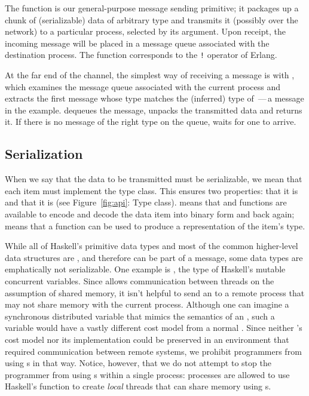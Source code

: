 \documentclass[preprint]{sigplanconf}
\begin{document}
The  function is our general-purpose message sending primitive; it packages up a chunk of (serializable) data of arbitrary type and transmits it (possibly over the network) to a particular process, selected by its  argument.
Upon receipt, the incoming message will be placed in a message queue associated with the destination process. 
The  function corresponds to the \texttt{!} operator of Erlang.

At the far end of the channel, the simplest way of receiving a message is with , which
examines the message queue associated with the current process and extracts the first message whose type matches the (inferred) type of \,---\,a  message in the example.  
 dequeues the message, unpacks the transmitted data and returns it.
If there is no message of the right type on the queue,  waits for one to arrive.

\subsection{Serialization} 
\label{s:serialization}

When we say that the data to be transmitted must be serializable, we mean that each item must implement the  type class.  This ensures two properties: that it is  and that it is  (see Figure~\ref{fig:api}: Type class).
 means that  and  functions are available to encode and decode the data  item into binary form and back again;  means that a function  can be used to produce a representation of the item's type.  

While all of Haskell's primitive data types and most of the common higher-level data structures are , and therefore can be part of a message, some data types are emphatically not serializable. One example is , the type of Haskell's mutable concurrent variables. Since  allows communication between threads on the assumption of shared memory, it isn't helpful to send an  to a remote process that may not share memory with the current process. Although one can imagine a synchronous distributed variable that mimics the semantics of an , such a variable would have a vastly different cost model from a normal . Since neither 's cost model nor its implementation could be preserved in an environment that required communication between remote systems, we  prohibit programmers from using s in that way.  Notice, however, that we do not attempt to stop the programmer from using s within a single process: processes are allowed to use Haskell's  function to create \emph{local} threads that can share memory using s.
\end{document}
